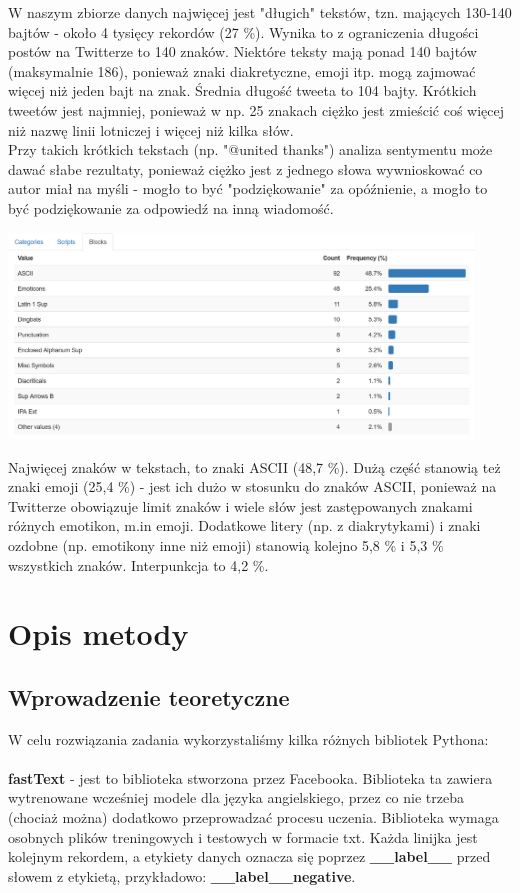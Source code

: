 \documentclass[11pt, a4paper, notitlepage]{report}
\begin{document}
W naszym zbiorze danych najwięcej jest "długich" tekstów, tzn. mających 130-140 bajtów - około 4 tysięcy rekordów (27 \%). Wynika to z ograniczenia długości postów na Twitterze to 140 znaków. Niektóre teksty mają ponad 140 bajtów (maksymalnie 186), ponieważ znaki diakretyczne, emoji itp. mogą zajmować więcej niż jeden bajt na znak. Średnia długość tweeta to 104 bajty. Krótkich tweetów jest najmniej, ponieważ w np. 25 znakach ciężko jest zmieścić coś więcej niż nazwę linii lotniczej i więcej niż kilka słów. \\
Przy takich krótkich tekstach (np. "@united thanks") analiza sentymentu może dawać słabe rezultaty, ponieważ ciężko jest z jednego słowa wywnioskować co autor miał na myśli - mogło to być "podziękowanie" za opóźnienie, a mogło to być podziękowanie za odpowiedź na inną wiadomość.



\begin{center}
\includegraphics[width=350pt]{graphics/analiza_rodzajow_znakow.png}
\end{center}
Najwięcej znaków w tekstach, to znaki ASCII (48,7 \%). Dużą część stanowią też znaki emoji (25,4 \%) - jest ich dużo w stosunku do znaków ASCII, ponieważ na Twitterze obowiązuje limit znaków i wiele słów jest zastępowanych znakami różnych emotikon, m.in emoji. Dodatkowe litery (np. z diakrytykami) i znaki ozdobne (np. emotikony inne niż emoji) stanowią kolejno 5,8 \% i 5,3 \% wszystkich znaków. Interpunkcja to 4,2 \%.


\chapter{Opis metody}
\section{Wprowadzenie teoretyczne}
W celu rozwiązania zadania wykorzystaliśmy kilka różnych bibliotek Pythona:
\\ \\ {\bf fastText} - jest to biblioteka stworzona przez Facebooka. Biblioteka ta zawiera wytrenowane wcześniej modele dla języka angielskiego, przez co nie trzeba (chociaż można) dodatkowo przeprowadzać procesu uczenia. Biblioteka wymaga osobnych plików treningowych i testowych w formacie txt. Każda linijka jest kolejnym rekordem, a etykiety danych oznacza się poprzez {\bf \_\_label\_\_} przed słowem z etykietą, przykładowo: {\bf \_\_label\_\_negative}.
\\ \\
\end{document}
